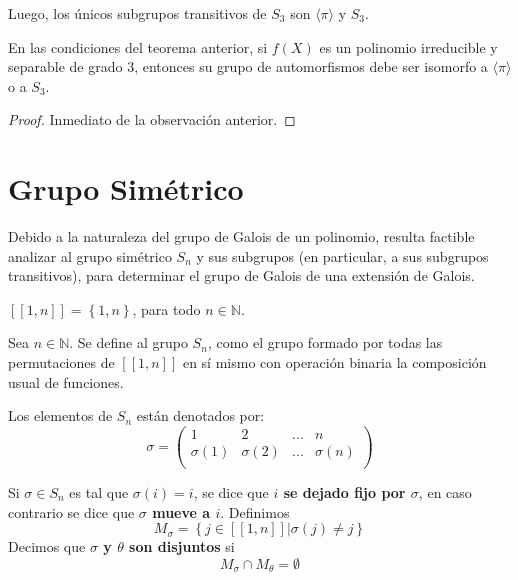 \documentclass[12pt]{report}
\theoremstyle{largebreak}
\newcommand\natint[1]{\ensuremath{\left[\!\left[ #1\right]\!\right]}}
\begin{document}
\begin{obs}
        Luego, los únicos subgrupos transitivos de $S_3$ son $\langle\pi\rangle$ y $S_3$.
    \end{obs}

    \begin{cor}
        En las condiciones del teorema anterior, si $f(X)$ es un polinomio irreducible y separable de grado $3$, entonces su grupo de automorfismos debe ser isomorfo a $\langle\pi\rangle$ o a $S_3$.
    \end{cor}

    \begin{proof}
        Inmediato de la observación anterior.
    \end{proof}

    \section{Grupo Simétrico}

    Debido a la naturaleza del grupo de Galois de un polinomio, resulta factible analizar al grupo simétrico $S_n$ y sus subgrupos (en particular, a sus subgrupos transitivos), para determinar el grupo de Galois de una extensión de Galois.

    \begin{obs}
        $\natint{1,n}=\left\{1,n\right\}$, para todo $n\in\mathbb{N}$.
    \end{obs}

    \begin{mydef}
        Sea $n\in\mathbb{N}$. Se define al grupo $S_n$, como el grupo formado por todas las permutaciones de $\natint{1,n}$ en sí mismo con operación binaria la composición usual de funciones.
    \end{mydef}

    Los elementos de $S_n$ están denotados por:
    \begin{equation*}
        \sigma=\left(
            \begin{array}{cccc}
                1 & 2 & ... & n\\
                \sigma(1) & \sigma(2) & ... & \sigma(n)\\
            \end{array}
        \right)
    \end{equation*}

    Si $\sigma\in S_n$ es tal que $\sigma(i)=i$, se dice que \textbf{$i$ se dejado fijo por $\sigma$}, en caso contrario se dice que \textbf{$\sigma$ mueve a $i$}. Definimos
    \begin{equation*}
        M_\sigma=\left\{j\in\natint{1,n}\Big|\sigma(j)\neq j \right\}
    \end{equation*}
    Decimos que \textbf{$\sigma$ y $\theta$ son disjuntos} si
    \begin{equation*}
        M_\sigma\cap M_\theta=\emptyset
    \end{equation*}
\end{document}
